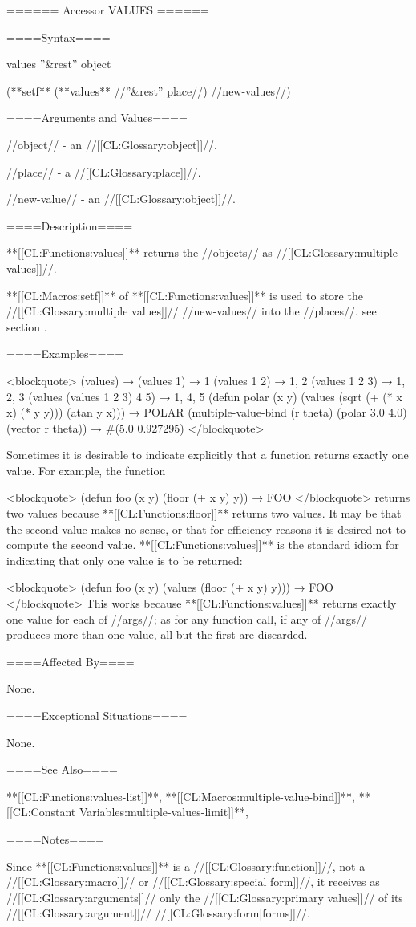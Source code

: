 ====== Accessor VALUES ======

====Syntax====

\DefunWithValues values {''&rest'' object} {}

(**setf** (**values** //''&rest'' place//) //new-values//)

====Arguments and Values====

//object// - an //[[CL:Glossary:object]]//.

//place// - a //[[CL:Glossary:place]]//.

//new-value// - an //[[CL:Glossary:object]]//.

====Description====

**[[CL:Functions:values]]** returns the //objects// as //[[CL:Glossary:multiple values]]//.

**[[CL:Macros:setf]]** of **[[CL:Functions:values]]** is used to store the //[[CL:Glossary:multiple values]]// //new-values// into the //places//. see section {\secref\SETFofVALUES}.

====Examples====

<blockquote> (values) → \novalues (values 1) → 1 (values 1 2) → 1, 2 (values 1 2 3) → 1, 2, 3 (values (values 1 2 3) 4 5) → 1, 4, 5 (defun polar (x y) (values (sqrt (+ (* x x) (* y y))) (atan y x))) → POLAR (multiple-value-bind (r theta) (polar 3.0 4.0) (vector r theta)) → #(5.0 0.927295) </blockquote>

Sometimes it is desirable to indicate explicitly that a function returns exactly one value. For example, the function

<blockquote> (defun foo (x y) (floor (+ x y) y)) → FOO </blockquote> returns two values because **[[CL:Functions:floor]]** returns two values. It may be that the second value makes no sense, or that for efficiency reasons it is desired not to compute the second value. **[[CL:Functions:values]]** is the standard idiom for indicating that only one value is to be returned:

<blockquote> (defun foo (x y) (values (floor (+ x y) y))) → FOO </blockquote> This works because **[[CL:Functions:values]]** returns exactly one value for each of //args//; as for any function call, if any of //args// produces more than one value, all but the first are discarded.

====Affected By====

None.

====Exceptional Situations====

None.

====See Also====

**[[CL:Functions:values-list]]**, **[[CL:Macros:multiple-value-bind]]**, **[[CL:Constant Variables:multiple-values-limit]]**, {\secref\Evaluation}

====Notes====

Since **[[CL:Functions:values]]** is a //[[CL:Glossary:function]]//, not a //[[CL:Glossary:macro]]// or //[[CL:Glossary:special form]]//, it receives as //[[CL:Glossary:arguments]]// only the //[[CL:Glossary:primary values]]// of its //[[CL:Glossary:argument]]// //[[CL:Glossary:form|forms]]//.

  
